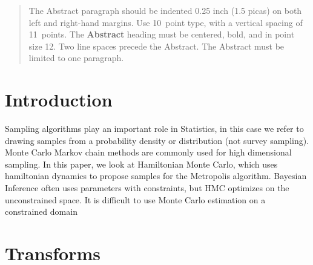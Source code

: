 \documentclass[twoside]{article}
\begin{document}
%

%


\begin{abstract}
  The Abstract paragraph should be indented 0.25 inch (1.5 picas) on
  both left and right-hand margins. Use 10~point type, with a vertical
  spacing of 11~points. The \textbf{Abstract} heading must be centered,
  bold, and in point size 12. Two line spaces precede the
  Abstract. The Abstract must be limited to one paragraph.
\end{abstract}

\section{Introduction}

Sampling algorithms play an important role in Statistics, in this case we refer to drawing samples from a probability density or distribution (not survey sampling). Monte Carlo Markov chain methods are commonly used for high dimensional sampling. In this paper, we look at Hamiltonian Monte Carlo, which uses hamiltonian dynamics to propose samples for the Metropolis algorithm. Bayesian Inference often uses parameters with constraints, but HMC optimizes on the unconstrained space. It is difficult to use Monte Carlo estimation on a constrained domain ~\cite{neal2008optimal}


\section{Transforms}
\end{document}

